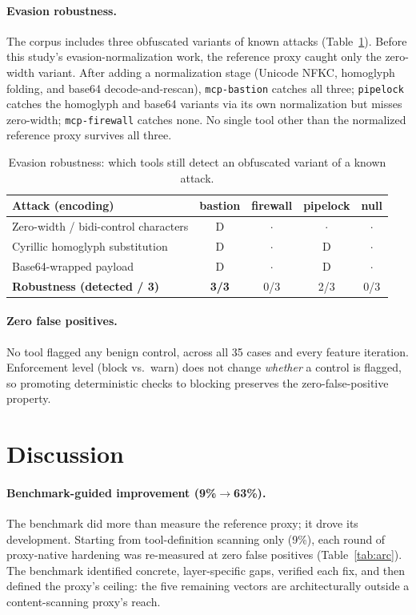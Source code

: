 \documentclass[11pt]{article}
\newcommand{\code}[1]{\texttt{\small #1}}
\begin{document}
\paragraph{Evasion robustness.} The corpus includes three obfuscated variants of known attacks (Table~\ref{tab:evasion}). Before this study's evasion-normalization work, the reference proxy caught only the zero-width variant. After adding a normalization stage (Unicode NFKC, homoglyph folding, and base64 decode-and-rescan), \code{mcp-bastion} catches all three; \code{pipelock} catches the homoglyph and base64 variants via its own normalization but misses zero-width; \code{mcp-firewall} catches none. No single tool other than the normalized reference proxy survives all three.

\begin{table}[h]
\centering
\caption{Evasion robustness: which tools still detect an obfuscated variant of a known attack.}
\label{tab:evasion}
\small
\begin{tabular}{@{}lcccc@{}}
\toprule
Attack (encoding) & bastion & firewall & pipelock & null \\
\midrule
Zero-width / bidi-control characters & D & $\cdot$ & $\cdot$ & $\cdot$ \\
Cyrillic homoglyph substitution & D & $\cdot$ & D & $\cdot$ \\
Base64-wrapped payload & D & $\cdot$ & D & $\cdot$ \\
\midrule
\textbf{Robustness (detected / 3)} & \textbf{3/3} & 0/3 & 2/3 & 0/3 \\
\bottomrule
\end{tabular}
\end{table}

\paragraph{Zero false positives.} No tool flagged any benign control, across all 35 cases and every feature iteration. Enforcement level (block vs.\ warn) does not change \emph{whether} a control is flagged, so promoting deterministic checks to blocking preserves the zero-false-positive property.

\section{Discussion}
\label{sec:discussion}

\paragraph{Benchmark-guided improvement (9\%$\rightarrow$63\%).} The benchmark did more than measure the reference proxy; it drove its development. Starting from tool-definition scanning only (9\%), each round of proxy-native hardening was re-measured at zero false positives (Table~\ref{tab:arc}). The benchmark identified concrete, layer-specific gaps, verified each fix, and then defined the proxy's ceiling: the five remaining vectors are architecturally outside a content-scanning proxy's reach.
\end{document}

